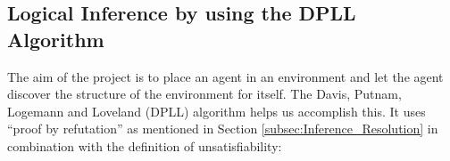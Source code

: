 %



\subsection{Logical Inference by using the DPLL Algorithm}
\label{subsec:Inference_DPLL}

The aim of the project is to place an agent in an environment and let the agent discover the structure of the environment for itself. The Davis, Putnam, Logemann and Loveland (DPLL) algorithm helps us accomplish this.
It uses ``proof by refutation'' as mentioned in Section \ref{subsec:Inference_Resolution} in combination with the definition of unsatisfiability: 

